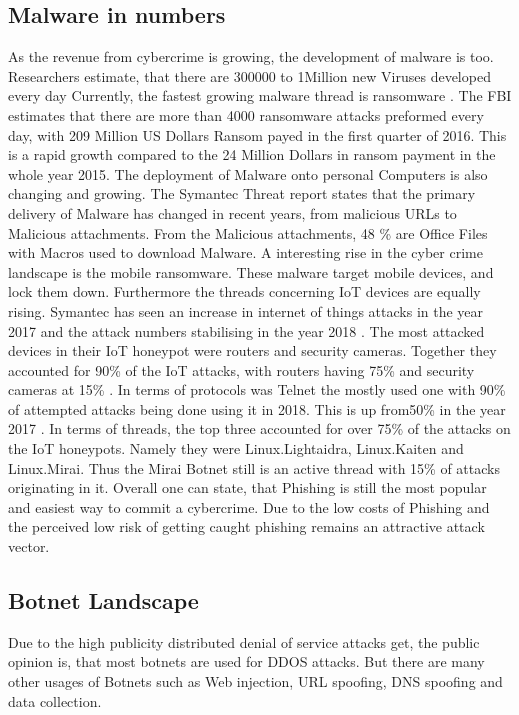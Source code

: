 \subsection{Malware in numbers}
As the revenue from cybercrime is growing, the development of malware is too. Researchers estimate, that there are 300000 to 1Million new Viruses developed every day  \cite{McAfee18} Currently, the fastest growing malware thread is ransomware  \cite{McAfee18}. The FBI estimates that there are more than 4000 ransomware attacks preformed every day, with 209 Million US Dollars Ransom payed in the first quarter of 2016. This is a rapid growth compared to the 24 Million Dollars in ransom payment in the whole year 2015. 
The deployment of Malware onto personal Computers is also changing and growing. The Symantec Threat report states that the primary delivery of Malware has changed in recent years, from malicious URLs to Malicious attachments. From the Malicious attachments, 48 \% are Office Files with Macros used to download Malware. 
A interesting rise in the cyber crime landscape is the mobile ransomware. These malware target mobile devices, and lock them down. \cite{Symantec19}
Furthermore the threads concerning IoT devices are equally rising. Symantec has seen an increase in internet of things attacks in the year 2017 and the attack numbers stabilising in the year 2018 \cite{Symantec19}. The most attacked devices in their IoT honeypot were routers and security cameras. Together they accounted for 90\% of the IoT attacks, with routers having 75\% and security cameras at 15\% \cite{Symantec19}. In terms of protocols was Telnet the mostly used one with 90\% of attempted attacks being done using it in 2018. This is up from50\% in the year 2017 \cite{Symantec19}. 
In terms of threads, the top three accounted for over 75\% of the attacks on the IoT honeypots. Namely they were Linux.Lightaidra, Linux.Kaiten and Linux.Mirai. Thus the Mirai Botnet still is an active thread with 15\% of attacks originating in it. \cite{Symantec19}
Overall one can state, that Phishing is still the most popular and easiest way to commit a cybercrime. Due to the low costs of Phishing and the perceived low risk of getting caught phishing remains an attractive attack vector. \cite{McAfee18}

\subsection{Botnet Landscape}

Due to the high publicity distributed denial of service attacks get, the public opinion is, that most botnets are used for DDOS attacks. But there are many other usages of Botnets such as Web injection, URL spoofing, DNS spoofing and data collection. \cite{Eremin19}

